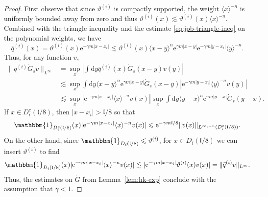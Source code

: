 \documentclass[11pt, a4paper]{scrartcl}
\numberwithin{equation}{section}
\theoremstyle{plain}
\theoremstyle{remark}
\newcommand{\mathd}{\mathrm{d}}
\newcommand{\mathe}{\mathrm{e}}
\begin{document}
\begin{proof}
	First observe that since $\vartheta^{(i)}$ is compactly supported, the weight
	$\langle x \rangle^{- n}$ is uniformly bounded away from zero and thus
	$\vartheta^{(i)} (x) \lesssim \vartheta^{(i)} (x) \langle x \rangle^{- n}$. Combined
	with the triangle inequality and the estimate \eqref{eq:jpb-triangle-ineq}
	on the polynomial weights, we have
	\begin{equation}
		\bar{q}^{(i)} (x) = \vartheta^{(i)} (x) \mathe^{- \gamma m | x - x_i |} \lesssim
		\vartheta^{(i)} (x) \langle x - y \rangle^n \mathe^{\gamma m | x - y |}
		\mathe^{- \gamma m | y - x_i |} \langle y \rangle^{- n} .
		\label{eq:rho-est}
	\end{equation}
	Thus, for any function $v$,
	\[ \begin{aligned}
			\| q^{(i)}  \dot{G}_s v \|_{L^{\infty}} & = \sup_x \left| \int \mathd
			y \bar{q}^{(i)} (x)  \dot{G}_s (x - y) v (y) \right|                                                   \\
			                                        & \lesssim  \sup_x  \int \mathd y \langle x - y \rangle^n
			\mathe^{\gamma m | x - y |}  \dot{G}_s (x - y) | \mathe^{- \gamma m | y
			- x_i |} \langle y \rangle^{- n} v (y) |                                                               \\
			                                        & \lesssim  \sup_x | \mathe^{- \gamma m | x - x_i |} \langle x
			\rangle^{- n} v (x) | \sup_x  \int \mathd y \langle y - x \rangle^n
			\mathe^{\gamma m | y - x |}  \dot{G}_s (y - x) .
		\end{aligned} \]
	If $x \in D_i^c (\mathfrak{l}/ 8)$, then $| x - x_i | >\mathfrak{l}/ 8$ so
	that
	\[ \mathbbm{1}_{D_i^c (\mathfrak{l}/ 8)} (x) | \mathe^{- \gamma m | x - x_i
			|} \langle x \rangle^{- n} v (x) | \leqslant \mathe^{- \gamma
			m\mathfrak{l}/ 8} \| v (x) \|_{L^{\infty, - n} (D_i^c (\mathfrak{l}/ 8))}
		. \]
	On the other hand, since $\mathbbm{1}_{D_i (\mathfrak{l}/ 8)}
		\leqslant \vartheta^{(i)}$, for $x \in D_i (\mathfrak{l}/ 8)$ we can insert
	$\vartheta^{(i)}$ to find
	\[ \mathbbm{1}_{D_i (\mathfrak{l}/ 8)} (x) | \mathe^{- \gamma m | x - x_i |}
		\langle x \rangle^{- n} v (x) | \lesssim | \mathe^{- \gamma m | x - x_i
			|} \vartheta^{(i)} (x) v (x) | = \| \bar{q}^{(i)} v \|_{L^{\infty}} . \]
	Thus, the estimates on $\dot{G}$ from Lemma~\ref{lem:hk-exp} conclude with
	the assumption that $\gamma < 1$.
\end{proof}
\end{document}
